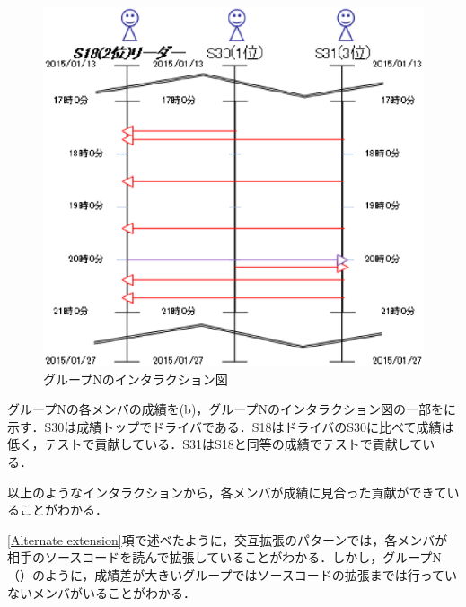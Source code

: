 \begin{figure}[h]
	\begin{center}
		\includegraphics[scale=0.75]{img/flowN.eps}
		\caption{グループNのインタラクション図}
		\label{fig:flowN}
	\end{center}
\end{figure}


グループNの各メンバの成績を(b)，グループNのインタラクション図の一部をに示す．S30は成績トップでドライバである．S18はドライバのS30に比べて成績は低く，テストで貢献している．S31はS18と同等の成績でテストで貢献している．

以上のようなインタラクションから，各メンバが成績に見合った貢献ができていることがわかる．

\ref{Alternate extension}項で述べたように，交互拡張のパターンでは，各メンバが相手のソースコードを読んで拡張していることがわかる．しかし，グループN（）のように，成績差が大きいグループではソースコードの拡張までは行っていないメンバがいることがわかる．